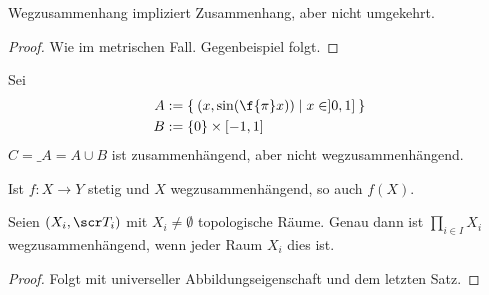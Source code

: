 \begin{st}
	Wegzusammenhang impliziert Zusammenhang, aber nicht umgekehrt.
	\begin{proof}
		Wie im metrischen Fall.
		Gegenbeispiel folgt. %
	\end{proof}
\end{st}

\begin{ex}
	Sei
	\begin{align*}
		A &:= \Set{ (x, \sin( \f {\pi}x)) | x \in ]0,1] } \\
		B &:= \{0\} \times [-1, 1]
	\end{align*}
	$C = \_A = A \cup B$ ist zusammenhängend, aber nicht wegzusammenhängend.
\end{ex}


\begin{st}
	Ist $f: X \to Y$ stetig und $X$ wegzusammenhängend, so auch $f(X)$.
\end{st}

\begin{st}
	Seien $(X_i, \scr T_i)$ mit $X_i \neq \emptyset$ topologische Räume.
	Genau dann ist $\prod_{i \in I} X_i$ wegzusammenhängend, wenn jeder Raum $X_i$ dies ist.
	\begin{proof}
		Folgt mit universeller Abbildungseigenschaft und dem letzten Satz.
	\end{proof}
\end{st}

